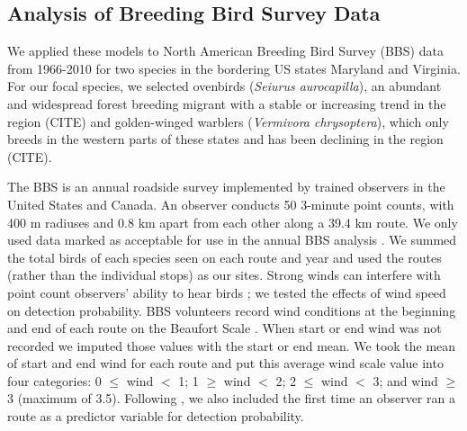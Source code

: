 \documentclass[12pt]{article}
\begin{document}

\subsection{Analysis of Breeding Bird Survey Data}

We applied these models to North American Breeding Bird Survey
(BBS) data from 1966-2010 for two species in the bordering US states
Maryland and Virginia. For our focal species, we selected
ovenbirds (\textit{Seiurus aurocapilla}), an abundant and widespread
forest breeding migrant with a stable or increasing trend in the region (CITE)
and golden-winged warblers (\textit{Vermivora chrysoptera}), which
only breeds in the western parts of these states and has been declining in the
region (CITE).  %

The BBS is an annual roadside survey implemented by trained
observers in the United States and Canada. An observer conducts 50
3-minute point counts, with 400 m radiuses and 0.8 km apart from each other along a
39.4 km route. We only used data marked as acceptable for use in the annual BBS
analysis \citep{sauer_etal:1994auk}.  We summed the total birds of each
species seen on each route and year and used the routes (rather
than the individual stops) as our sites.
Strong winds can interfere with point count observers' ability
to hear birds \citep{simons_etal:2007}; we tested the effects of wind
speed on detection probability. BBS volunteers record wind conditions
at the beginning and end of each route on the Beaufort Scale
\citep[start and end wind]{robbins_etal:1986}.
When start or end wind was not recorded we imputed those values with
the start or end mean. We took the mean of start and end wind for
each route and put this average wind scale value into four
categories: 0 $\leq$ wind $<$ 1; 1 $\geq$ wind $<$ 2; 2 $\leq$ wind $<$ 3; and wind
$\geq$ 3 (maximum of 3.5).
Following \citet{link_sauer:2002},
we also included the first time an observer ran a route as a predictor variable for detection
probability.
\end{document}
